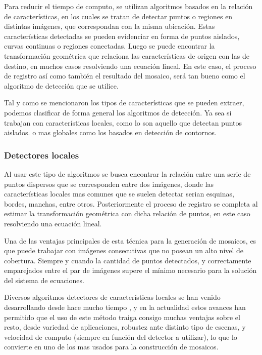 
Para reducir el tiempo de computo, se utilizan algoritmos basados en la relación de características, en los cuales se tratan de detectar puntos o regiones en distintas imágenes, que correspondan con la misma ubicación. Estas características detectadas se pueden evidenciar en forma de puntos aislados, curvas continuas o regiones conectadas. Luego se puede encontrar la transformación geométrica que relaciona las características de origen con las de destino, en muchos casos resolviendo una ecuación lineal. En este caso, el proceso de registro así como también el resultado del mosaico, será tan bueno como el algoritmo de detección que se utilice.

Tal y como se mencionaron los tipos de características que se pueden extraer, podemos clasificar de forma general los algoritmos de detección. Ya sea si trabajan con características locales, como lo son aquello que detectan puntos aislados. o mas globales como los basados en detección de contornos.

\subsubsection*{Detectores locales}

Al usar este tipo de algoritmos se busca encontrar la relación entre una serie de puntos dispersos que se corresponden entre dos imágenes, donde las características locales mas comunes que se suelen detectar serian esquinas, bordes, manchas, entre otros. Posteriormente el proceso de registro se completa al estimar la transformación geométrica con dicha relación de puntos, en este caso resolviendo una ecuación lineal.

Una de las ventajas principales de esta técnica para la generación de mosaicos, es que puede trabajar con imágenes consecutivas que no posean un alto nivel de cobertura. Siempre y cuando la cantidad de puntos detectados, y correctamente emparejados entre el par de imágenes supere el mínimo necesario para la solución del sistema de ecuaciones.

Diversos algoritmos detectores de características locales se han venido desarrollando desde hace mucho tiempo \cite{harris,sift,surf,orb,kaze,akaze}, y en la actualidad estos avances han permitido que el uso de este método traiga consigo muchas ventajas sobre el resto, desde variedad de aplicaciones, robustez ante distinto tipo de escenas, y velocidad de computo (siempre en función del detector a utilizar), lo que lo convierte en uno de los mas usados para la construcción de mosaicos.

